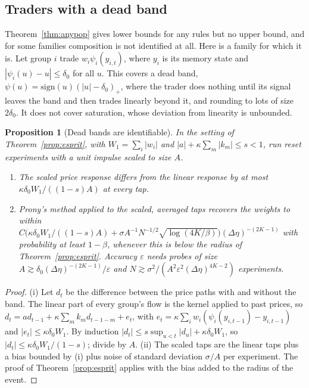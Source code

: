 \documentclass[12pt]{article}
\newtheorem{proposition}[theorem]{Proposition}
\theoremstyle{definition}
\theoremstyle{remark}
\begin{document}
\subsection{Traders with a dead band}

Theorem~\ref{thm:anypop} gives lower bounds for any rules but no upper bound, and for some families composition is not identified at all. Here is a family for which it is. Let group $i$ trade $w_i\psi_i(y_{i,t})$, where $y_i$ is its memory state and $|\psi_i(u)-u|\le\delta_0$ for all $u$. This covers a dead band, $\psi(u)=\mathrm{sign}(u)(|u|-\delta_0)_+$, where the trader does nothing until its signal leaves the band and then trades linearly beyond it, and rounding to lots of size $2\delta_0$. It does not cover saturation, whose deviation from linearity is unbounded.

\begin{proposition}[Dead bands are identifiable]\label{prop:deadband}
In the setting of Theorem~\ref{prop:esprit}, with $W_1=\sum_i|w_i|$ and $|a|+\kappa\sum_m|k_m|\le s<1$, run reset experiments with a unit impulse scaled to size $A$.
\begin{enumerate}[label=(\roman*),itemsep=1pt]
\item The scaled price response differs from the linear response by at most $\kappa\delta_0W_1/((1-s)A)$ at every tap.
\item Prony's method applied to the scaled, averaged taps recovers the weights to within $C\bigl(\kappa\delta_0W_1/((1-s)A)+\sigma A^{-1}N^{-1/2}\sqrt{\log(4K/\beta)}\bigr)(\Delta\eta)^{-(2K-1)}$ with probability at least $1-\beta$, whenever this is below the radius of Theorem~\ref{prop:esprit}. Accuracy $\varepsilon$ needs probes of size $A\gtrsim\delta_0(\Delta\eta)^{-(2K-1)}/\varepsilon$ and $N\gtrsim\sigma^2/(A^2\varepsilon^2(\Delta\eta)^{4K-2})$ experiments.
\end{enumerate}
\end{proposition}

\begin{proof}
(i) Let $d_t$ be the difference between the price paths with and without the band. The linear part of every group's flow is the kernel applied to past prices, so $d_t=ad_{t-1}+\kappa\sum_mk_md_{t-1-m}+e_t$, with $e_t=\kappa\sum_iw_i(\psi_i(y_{i,t-1})-y_{i,t-1})$ and $|e_t|\le\kappa\delta_0W_1$. By induction $|d_t|\le s\sup_{u<t}|d_u|+\kappa\delta_0W_1$, so $|d_t|\le\kappa\delta_0W_1/(1-s)$; divide by $A$. (ii) The scaled taps are the linear taps plus a bias bounded by (i) plus noise of standard deviation $\sigma/A$ per experiment. The proof of Theorem~\ref{prop:esprit} applies with the bias added to the radius of the event.
\end{proof}
\end{document}
